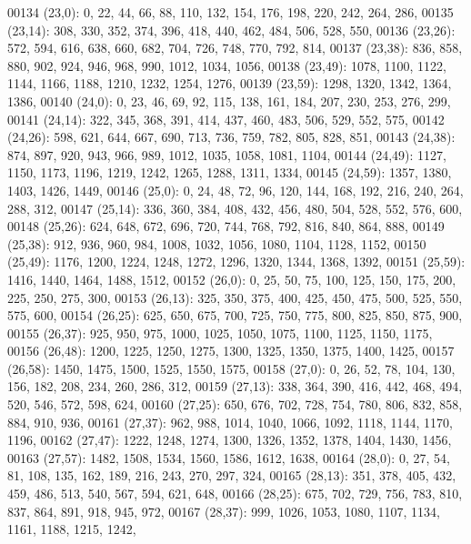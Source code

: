 \begin{DoxyCode}
00134       (23,0): 0, 22, 44, 66, 88, 110, 132, 154, 176, 198, 220, 242, 264, 286,
00135       (23,14): 308, 330, 352, 374, 396, 418, 440, 462, 484, 506, 528, 550,
00136       (23,26): 572, 594, 616, 638, 660, 682, 704, 726, 748, 770, 792, 814,
00137       (23,38): 836, 858, 880, 902, 924, 946, 968, 990, 1012, 1034, 1056,
00138       (23,49): 1078, 1100, 1122, 1144, 1166, 1188, 1210, 1232, 1254, 1276,
00139       (23,59): 1298, 1320, 1342, 1364, 1386,
00140       (24,0): 0, 23, 46, 69, 92, 115, 138, 161, 184, 207, 230, 253, 276, 299,
00141       (24,14): 322, 345, 368, 391, 414, 437, 460, 483, 506, 529, 552, 575,
00142       (24,26): 598, 621, 644, 667, 690, 713, 736, 759, 782, 805, 828, 851,
00143       (24,38): 874, 897, 920, 943, 966, 989, 1012, 1035, 1058, 1081, 1104,
00144       (24,49): 1127, 1150, 1173, 1196, 1219, 1242, 1265, 1288, 1311, 1334,
00145       (24,59): 1357, 1380, 1403, 1426, 1449,
00146       (25,0): 0, 24, 48, 72, 96, 120, 144, 168, 192, 216, 240, 264, 288, 312,
00147       (25,14): 336, 360, 384, 408, 432, 456, 480, 504, 528, 552, 576, 600,
00148       (25,26): 624, 648, 672, 696, 720, 744, 768, 792, 816, 840, 864, 888,
00149       (25,38): 912, 936, 960, 984, 1008, 1032, 1056, 1080, 1104, 1128, 1152,
00150       (25,49): 1176, 1200, 1224, 1248, 1272, 1296, 1320, 1344, 1368, 1392,
00151       (25,59): 1416, 1440, 1464, 1488, 1512,
00152       (26,0): 0, 25, 50, 75, 100, 125, 150, 175, 200, 225, 250, 275, 300,
00153       (26,13): 325, 350, 375, 400, 425, 450, 475, 500, 525, 550, 575, 600,
00154       (26,25): 625, 650, 675, 700, 725, 750, 775, 800, 825, 850, 875, 900,
00155       (26,37): 925, 950, 975, 1000, 1025, 1050, 1075, 1100, 1125, 1150, 1175,
00156       (26,48): 1200, 1225, 1250, 1275, 1300, 1325, 1350, 1375, 1400, 1425,
00157       (26,58): 1450, 1475, 1500, 1525, 1550, 1575,
00158       (27,0): 0, 26, 52, 78, 104, 130, 156, 182, 208, 234, 260, 286, 312,
00159       (27,13): 338, 364, 390, 416, 442, 468, 494, 520, 546, 572, 598, 624,
00160       (27,25): 650, 676, 702, 728, 754, 780, 806, 832, 858, 884, 910, 936,
00161       (27,37): 962, 988, 1014, 1040, 1066, 1092, 1118, 1144, 1170, 1196,
00162       (27,47): 1222, 1248, 1274, 1300, 1326, 1352, 1378, 1404, 1430, 1456,
00163       (27,57): 1482, 1508, 1534, 1560, 1586, 1612, 1638,
00164       (28,0): 0, 27, 54, 81, 108, 135, 162, 189, 216, 243, 270, 297, 324,
00165       (28,13): 351, 378, 405, 432, 459, 486, 513, 540, 567, 594, 621, 648,
00166       (28,25): 675, 702, 729, 756, 783, 810, 837, 864, 891, 918, 945, 972,
00167       (28,37): 999, 1026, 1053, 1080, 1107, 1134, 1161, 1188, 1215, 1242,

\end{DoxyCode}
